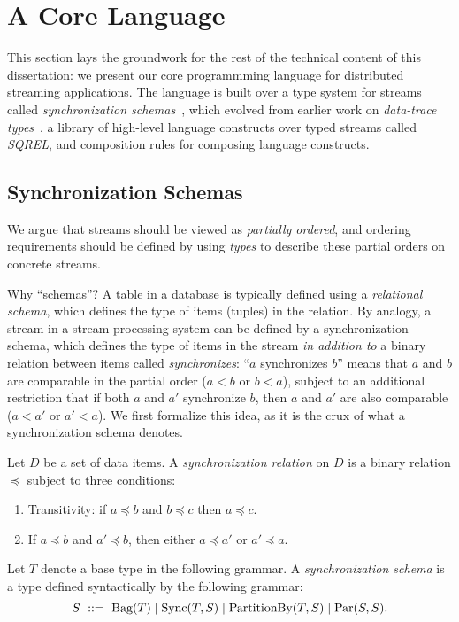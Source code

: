 \section{A Core Language}
\label{sec:language}

This section lays the groundwork for the rest of the technical content of this dissertation: we present our core programmming language for distributed streaming applications. The language is built over a type system for streams called \emph{synchronization schemas}~, which evolved from earlier work on \emph{data-trace types}~. a library of high-level language constructs over typed streams called \emph{SQREL}, and composition rules for composing language constructs.

\subsection{Synchronization Schemas}

We argue that streams should be viewed as \emph{partially ordered},
and ordering requirements should be defined by using
\emph{types} to describe these partial orders on concrete streams.

Why ``schemas''? A table in a database is typically defined using a \emph{relational schema}, which defines the type of items (tuples) in the relation. By analogy, a stream in a stream processing system can be defined by a synchronization schema, which defines the type of items in the stream \emph{in addition to} a binary relation between items called \emph{synchronizes}: ``$a$ synchronizes $b$'' means that $a$ and $b$ are comparable in the partial order ($a < b$ or $b < a$), subject to an additional restriction that if both $a$ and $a'$ synchronize $b$, then $a$ and $a'$ are also comparable ($a < a'$ or $a' < a$).
We first formalize this idea, as it is the crux of what a synchronization schema denotes.

\begin{definition}
Let $D$ be a set of data items. A \emph{synchronization relation} on $D$ is a binary relation $\preceq$ subject to three conditions:
\begin{enumerate}[(1)]
\item Transitivity: if $a \preceq b$ and $b \preceq c$ then $a \preceq c$.
\item If $a \preceq b$ and $a' \preceq b$, then either $a \preceq a'$ or $a' \preceq a$.
\end{enumerate}
\end{definition}

\begin{definition}
Let $T$ denote a base type in the following grammar. A \emph{synchronization schema} is a type defined syntactically by the following grammar:
\[    S \ ::=\   \text{Bag}({T}) \mid
             \text{Sync}({T}, S) \mid
            \text{PartitionBy}({T}, S) \mid
             \text{Par}({S}, {S}).
\]
\end{definition}
